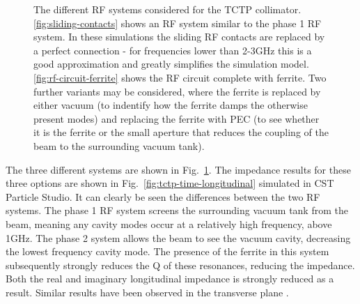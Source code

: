 \begin{figure}
\begin{center}
\end{center}
\caption{The different RF systems considered for the TCTP collimator. \ref{fig:sliding-contacts} shows an RF system similar to the phase 1 RF system. In these simulations the sliding RF contacts are replaced by a perfect connection - for frequencies lower than 2-3GHz this is a good approximation and greatly simplifies the simulation model. \ref{fig:rf-circuit-ferrite} shows the RF circuit complete with ferrite. Two further variants may be considered, where the ferrite is replaced by either vacuum (to indentify how the ferrite damps the otherwise present modes) and replacing the ferrite with PEC (to see whether it is the ferrite or the small aperture that reduces the coupling of the beam to the surrounding vacuum tank).}
\label{fig:rf-systems-tctp}
\end{figure}


The three different systems are shown in Fig.~\ref{fig:rf-systems-tctp}. The impedance results for these three options are shown in Fig.~\ref{fig:tctp-time-longitudinal} simulated in CST Particle Studio. It can clearly be seen the differences between the two RF systems. The phase 1 RF system screens the surrounding vacuum tank from the beam, meaning any cavity modes occur at a relatively high frequency, above 1GHz. The phase 2 system allows the beam to see the vacuum cavity, decreasing the lowest frequency cavity mode. The presence of the ferrite in this system subsequently strongly reduces the Q of these resonances, reducing the impedance. Both the real and imaginary longitudinal impedance is strongly reduced as a result. Similar results have been observed in the transverse plane \cite{Salvant:tctp}.

